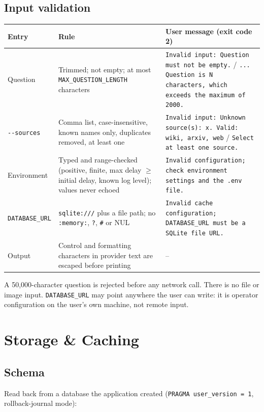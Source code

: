 \documentclass[11pt,a4paper]{article}
\newcommand{\cmd}[1]{\texttt{#1}}
\begin{document}
\subsection{Input validation}\label{sec:validation}

\begin{center}\small
\begin{tabularx}{\textwidth}{@{}lXX@{}}
\toprule
\textbf{Entry} & \textbf{Rule} & \textbf{User message (exit code 2)} \\
\midrule
Question & Trimmed; not empty; at most \cmd{MAX\_QUESTION\_LENGTH} characters &
\cmd{Invalid input: Question must not be empty.} / \cmd{... Question is N characters, which exceeds the maximum of 2000.} \\
\cmd{-{}-sources} & Comma list, case-insensitive, known names only, duplicates removed, at least one &
\cmd{Invalid input: Unknown source(s): x. Valid: wiki, arxiv, web} / \cmd{Select at least one source.} \\
Environment & Typed and range-checked (positive, finite, max delay $\ge$ initial delay, known log level); values never echoed &
\cmd{Invalid configuration; check environment settings and the .env file.} \\
\cmd{DATABASE\_URL} & \cmd{sqlite:///} plus a file path; no \cmd{:memory:}, \cmd{?}, \cmd{\#} or NUL &
\cmd{Invalid cache configuration; DATABASE\_URL must be a SQLite file URL.} \\
Output & Control and formatting characters in provider text are escaped before printing & -- \\
\bottomrule
\end{tabularx}
\end{center}

A 50{,}000-character question is rejected before any network call. There is no
file or image input. \cmd{DATABASE\_URL} may point anywhere the user can write:
it is operator configuration on the user's own machine, not remote input.

\section{Storage \& Caching}\label{sec:storage}

\subsection{Schema}

Read back from a database the application created
(\cmd{PRAGMA user\_version = 1}, rollback-journal mode):
\end{document}
